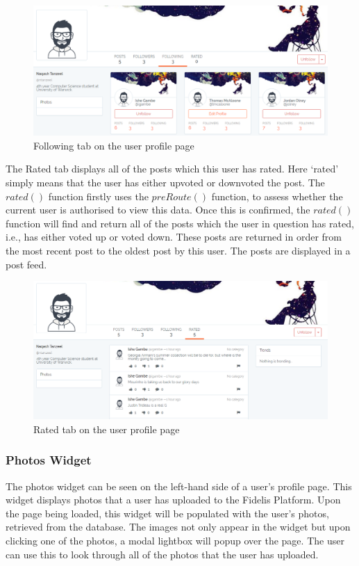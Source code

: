 \begin{figure}[H]
\centering
\includegraphics[width=\textwidth]{Images/Implementation/ProfileFollowing}
\caption{Following tab on the user profile page}
\label{fig:ProfileFollowing}
\end{figure}

The Rated tab displays all of the posts which this user has rated. Here `rated' simply means that the user has either upvoted or downvoted the post. The \(rated()\) function firstly uses the \(preRoute()\) function, to assess whether the current user is authorised to view this data. Once this is confirmed, the \(rated()\) function will find and return all of the posts which the user in question has rated, i.e., has either voted up or voted down. These posts are returned in order from the most recent post to the oldest post by this user. The posts are displayed in a post feed.

\begin{figure}[H]
\centering
\includegraphics[width=\textwidth]{Images/Implementation/ProfileRated}
\caption{Rated tab on the user profile page}
\label{fig:ProfileRated}
\end{figure}

\subsubsection{Photos Widget}
The photos widget can be seen on the left-hand side of a user's profile page. This widget displays photos that a user has uploaded to the Fidelis Platform. Upon the page being loaded, this widget will be populated with the user's photos, retrieved from the database. The images not only appear in the widget but upon clicking one of the photos, a modal lightbox will popup over the page. The user can use this to look through all of the photos that the user has uploaded.

